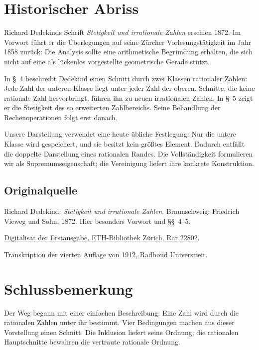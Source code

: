 \clearpage
\section{Historischer Abriss}
\label{cuts:history}

Richard Dedekinds Schrift \emph{Stetigkeit und irrationale Zahlen}
erschien 1872. Im Vorwort führt er die Überlegungen auf seine Zürcher
Vorlesungstätigkeit im Jahr 1858 zurück: Die Analysis sollte eine
arithmetische Begründung erhalten, die sich nicht auf eine als lückenlos
vorgestellte geometrische Gerade stützt.

In §~4 beschreibt Dedekind einen Schnitt durch zwei Klassen rationaler
Zahlen: Jede Zahl der unteren Klasse liegt unter jeder Zahl der oberen.
Schnitte, die keine rationale Zahl hervorbringt, führen ihn zu neuen
irrationalen Zahlen. In §~5 zeigt er die Stetigkeit des so erweiterten
Zahlbereichs. Seine Behandlung der Rechenoperationen folgt erst danach.

Unsere Darstellung verwendet eine heute übliche Festlegung: Nur die
untere Klasse wird gespeichert, und sie besitzt kein größtes Element.
Dadurch entfällt die doppelte Darstellung eines rationalen Randes.
Die Vollständigkeit formulieren wir als Supremumseigenschaft;
die Vereinigung liefert ihre konkrete Konstruktion.

\subsection*{Originalquelle}
\begingroup\small
Richard Dedekind: \emph{Stetigkeit und irrationale Zahlen}.
Braunschweig: Friedrich Vieweg und Sohn, 1872.
Hier besonders Vorwort und §§~4--5.\par
\href{https://doi.org/10.3931/e-rara-71757}{Digitalisat der Erstausgabe, ETH-Bibliothek Zürich, Rar 22802}.\par
\href{https://www.math.ru.nl/werkgroepen/gmfw/bronnen/dedekind2.html}{Transkription der vierten Auflage von 1912, Radboud Universiteit}.
\endgroup

\clearpage
\section{Schlussbemerkung}
\label{cuts:conclusion}

Der Weg begann mit einer einfachen Beschreibung: Eine Zahl wird durch
die rationalen Zahlen unter ihr bestimmt. Vier Bedingungen machen
aus dieser Vorstellung einen Schnitt. Die Inklusion liefert seine Ordnung;
die rationalen Hauptschnitte bewahren die vertraute rationale Ordnung.

